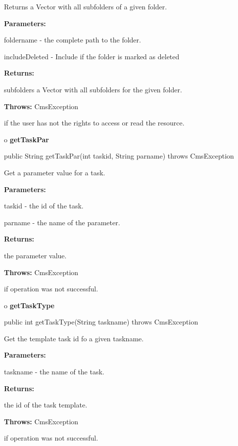 \begin{description}
\htmlDD Returns a Vector with all subfolders of a given folder.

\begin{description}
\item {\bf Parameters:}

foldername - the complete path to the folder.

includeDeleted - Include if the folder is marked as deleted
\item {\bf Returns:}

subfolders a Vector with all subfolders for the given folder.
\item {\bf Throws:} CmsException

if the user has not the rights to access or read the resource.
\end{description}

\end{description}

o {\bf getTaskPar}

\begin{PRE}
 public String getTaskPar(int taskid,
                          String parname) throws CmsException
\end{PRE}

\begin{description}
\htmlDD Get a parameter value for a task.

\begin{description}
\item {\bf Parameters:}

taskid - the id of the task.

parname - the name of the parameter.
\item {\bf Returns:}

the parameter value.
\item {\bf Throws:} CmsException

if operation was not successful.
\end{description}

\end{description}

o {\bf getTaskType}

\begin{PRE}
 public int getTaskType(String taskname) throws CmsException
\end{PRE}

\begin{description}
\htmlDD Get the template task id fo a given taskname.

\begin{description}
\item {\bf Parameters:}

taskname - the name of the task.
\item {\bf Returns:}

the id of the task template.
\item {\bf Throws:} CmsException

if operation was not successful.
\end{description}

\end{description}

